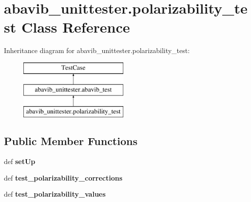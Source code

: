 \hypertarget{classabavib__unittester_1_1polarizability__test}{\section{abavib\+\_\+unittester.\+polarizability\+\_\+test Class Reference}
\label{classabavib__unittester_1_1polarizability__test}
}
Inheritance diagram for abavib\+\_\+unittester.\+polarizability\+\_\+test\+:\begin{figure}[H]
\begin{center}
\leavevmode
\includegraphics[height=3.000000cm]{classabavib__unittester_1_1polarizability__test}
\end{center}
\end{figure}
\subsection*{Public Member Functions}
\begin{DoxyCompactItemize}
\item 
\hypertarget{classabavib__unittester_1_1polarizability__test_aa5a23f608383c2742e092101a8cc3000}{def {\bfseries set\+Up}}\label{classabavib__unittester_1_1polarizability__test_aa5a23f608383c2742e092101a8cc3000}

\item 
\hypertarget{classabavib__unittester_1_1polarizability__test_aa03cd46336f00235226c5be6f18e7482}{def {\bfseries test\+\_\+polarizability\+\_\+corrections}}\label{classabavib__unittester_1_1polarizability__test_aa03cd46336f00235226c5be6f18e7482}

\item 
\hypertarget{classabavib__unittester_1_1polarizability__test_a5f0b7cc0e297040f881e80f81f050055}{def {\bfseries test\+\_\+polarizability\+\_\+values}}\label{classabavib__unittester_1_1polarizability__test_a5f0b7cc0e297040f881e80f81f050055}

\end{DoxyCompactItemize}
